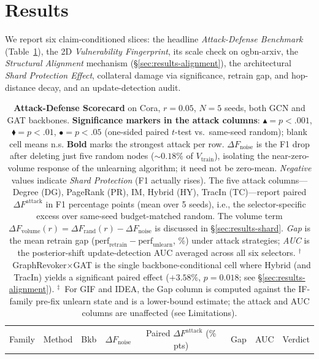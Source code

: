 \section{Results}
\label{sec:results}

We report six claim-conditioned slices: the headline
\emph{Attack-Defense Benchmark} (Table~\ref{tab:benchmark}), the 2D
\emph{Vulnerability Fingerprint}, its scale check on ogbn-arxiv, the
\emph{Structural Alignment} mechanism (\S\ref{sec:results-alignment}),
the architectural \emph{Shard Protection Effect}, collateral damage
via significance, retrain gap, and hop-distance decay, and an
update-detection audit.

\begin{table}[t]
\centering
\footnotesize
\setlength{\tabcolsep}{2pt}
\caption{\textbf{Attack-Defense Scorecard} on Cora, $r{=}0.05$,
$N{=}5$ seeds, both GCN and GAT backbones.
\textbf{Significance markers in the attack columns}:
$\blacktriangle\!=\!p{<}.001$,
$\blacklozenge\!=\!p{<}.01$,
$\bullet\!=\!p{<}.05$ (one-sided paired $t$-test
vs.\ same-seed random); blank cell means n.s.
\textbf{Bold} marks the strongest attack per row.
$\Delta F_{\mathrm{noise}}$ is the F1 drop after deleting just five
random nodes ($\sim 0.18\%$ of $V_{\mathrm{train}}$), isolating the
near-zero-volume response of the unlearning algorithm; it need not be
zero-mean. \emph{Negative} values indicate \emph{Shard Protection} (F1
actually rises). The five attack columns---Degree (DG), PageRank (PR),
IM, Hybrid (HY), TracIn (TC)---report paired
$\Delta F^{\mathrm{attack}}$ in F1 percentage points (mean over 5
seeds), i.e., the selector-specific excess over same-seed
budget-matched random. The volume term
$\Delta F_{\mathrm{volume}}(r)=\Delta F_{\mathrm{rand}}(r)-\Delta F_{\mathrm{noise}}$
is discussed in \S\ref{sec:results-shard}. \emph{Gap} is the mean retrain gap
($\mathrm{perf}_{\mathrm{retrain}}-\mathrm{perf}_{\mathrm{unlearn}}$,
\%) under attack strategies; \emph{AUC} is the posterior-shift
update-detection AUC averaged across all six selectors.
$^{\dagger}$~GraphRevoker$\times$GAT is the single backbone-conditional
cell where Hybrid (and TracIn) yields a significant paired effect
($+3.58\%$, $p{=}0.018$; see \S\ref{sec:results-alignment}).
$^{\ddagger}$~For GIF and IDEA, the Gap column is computed against the
IF-family pre-fix unlearn state and is a lower-bound estimate; the
attack and AUC columns are unaffected (see Limitations).}
\label{tab:benchmark}
\begin{tabular}{@{}llcrrrrrrrcl@{}}
\toprule
Family & Method & Bkb & $\Delta F_{\mathrm{noise}}$ & \multicolumn{5}{c}{Paired $\Delta F^{\mathrm{attack}}$ (\% pts)} & Gap & AUC & Verdict \\

\end{tabular}
\end{table}
